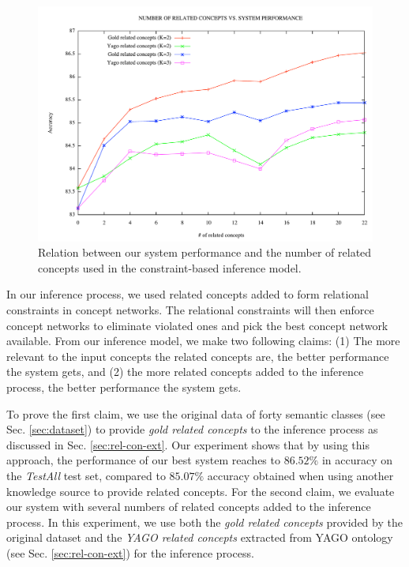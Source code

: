 \begin{figure}[t]
\centering
\includegraphics[totalheight=0.25\textheight]{relatedconcepts4}
\caption{Relation between our system performance and the number of
  related concepts used in the constraint-based inference model.}
\label{fig:related-concepts}
\end{figure}

In our inference process, we used related concepts added to form
relational constraints in concept networks. The relational constraints
will then enforce concept networks to eliminate violated ones and pick
the best concept network available. From our inference model, we make
two following claims: (1) The more relevant to the input concepts the
related concepts are, the better performance the system gets, and (2)
the more related concepts added to the inference process, the better
performance the system gets.

To prove the first claim, we use the original data of forty semantic
classes (see Sec. \ref{sec:dataset}) to provide {\em gold related
  concepts} to the inference process as discussed in
Sec. \ref{sec:rel-con-ext}. Our experiment shows that by using this
approach, the performance of our best system reaches to $86.52\%$ in
accuracy on the {\em TestAll} test set, compared to $85.07\%$ accuracy
obtained when using another knowledge source to provide related
concepts. For the second claim, we evaluate our system with several
numbers of related concepts added to the inference process. In this
experiment, we use both the {\em gold related concepts} provided by
the original dataset and the {\em YAGO related concepts} extracted
from YAGO ontology (see Sec. \ref{sec:rel-con-ext}) for the inference
process.

